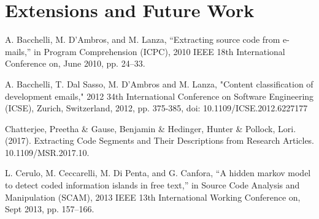 \documentclass[12pt]{scrreprt}
\begin{document}
\chapter{Extensions and Future Work}



\begin{thebibliography}{9}

    A. Bacchelli, M. D’Ambros, and M. Lanza, “Extracting source code from e-mails,” in Program Comprehension (ICPC), 2010 IEEE 18th International Conference on, June 2010, pp. 24–33.

    A. Bacchelli, T. Dal Sasso, M. D'Ambros and M. Lanza, "Content classification of development emails," 2012 34th International Conference on Software Engineering (ICSE), Zurich, Switzerland, 2012, pp. 375-385, doi: 10.1109/ICSE.2012.6227177

    Chatterjee, Preetha \& Gause, Benjamin \& Hedinger, Hunter \& Pollock, Lori. (2017). Extracting Code Segments and Their Descriptions from Research Articles. 10.1109/MSR.2017.10. 

    L. Cerulo, M. Ceccarelli, M. Di Penta, and G. Canfora, “A hidden markov model to detect coded information islands in free text,” in Source Code Analysis and Manipulation (SCAM), 2013 IEEE 13th International Working Conference on, Sept 2013, pp. 157–166.

\end{thebibliography}
\end{document}
